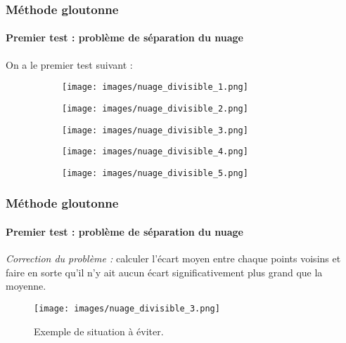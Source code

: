 \documentclass{beamer}
\begin{document}
\begin{frame}
	\frametitle{Méthode gloutonne}
	\framesubtitle{Premier test : problème de séparation du nuage}
	On a le premier test suivant : 
	\begin{figure}[!htb]
			\centering 
			\begin{subfigure}{0.25\textwidth}
				\centering 
				\texttt{[image: images/nuage\_divisible\_1.png]}
			\end{subfigure}
			\hspace*{\fill}
			\begin{subfigure}{0.25\textwidth}
				\centering 
				\texttt{[image: images/nuage\_divisible\_2.png]}
			\end{subfigure}
			\hspace*{\fill}
			\begin{subfigure}{0.25\textwidth}
				\centering 
				\texttt{[image: images/nuage\_divisible\_3.png]}
			\end{subfigure}
			\hspace*{\fill}
			
		\end{figure}
		\begin{figure}[!htb]

			\centering 
			\hspace*{\fill}
			\begin{subfigure}{0.25\textwidth}
				\centering 
				\texttt{[image: images/nuage\_divisible\_4.png]}
			\end{subfigure}
			\hspace*{\fill}
			\begin{subfigure}{0.25\textwidth}
				\centering 
				\texttt{[image: images/nuage\_divisible\_5.png]}
			\end{subfigure}
			\hspace*{\fill}
		\end{figure}
\end{frame}

\begin{frame}
	\frametitle{Méthode gloutonne}
	\framesubtitle{Premier test : problème de séparation du nuage}
	\emph{Correction du problème :} calculer l'écart moyen entre chaque points voisins et faire en sorte qu'il n'y ait aucun écart significativement plus grand que la moyenne.
	\begin{figure}
		\centering 
		\texttt{[image: images/nuage\_divisible\_3.png]}
		\caption{Exemple de situation à éviter.}
	\end{figure}
\end{frame}
\end{document}
